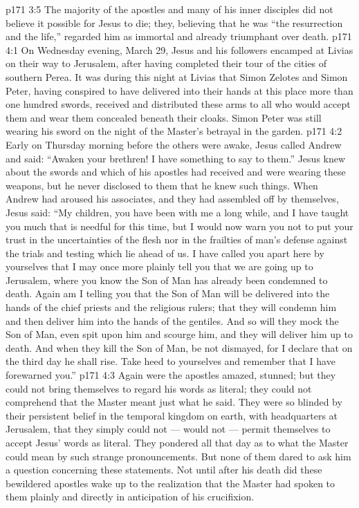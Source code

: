 \vs p171 3:5 The majority of the apostles and many of his inner disciples did not believe it possible for Jesus to die; they, believing that he was “the resurrection and the life,” regarded him as immortal and already triumphant over death.
\vs p171 4:1 On Wednesday evening, March 29, Jesus and his followers encamped at Livias on their way to Jerusalem, after having completed their tour of the cities of southern Perea. It was during this night at Livias that Simon Zelotes and Simon Peter, having conspired to have delivered into their hands at this place more than one hundred swords, received and distributed these arms to all who would accept them and wear them concealed beneath their cloaks. Simon Peter was still wearing his sword on the night of the Master’s betrayal in the garden.
\vs p171 4:2 Early on Thursday morning before the others were awake, Jesus called Andrew and said: \textcolor{ubdarkred}{“Awaken your brethren! I have something to say to them.”} Jesus knew about the swords and which of his apostles had received and were wearing these weapons, but he never disclosed to them that he knew such things. When Andrew had aroused his associates, and they had assembled off by themselves, Jesus said: \textcolor{ubdarkred}{“My children, you have been with me a long while, and I have taught you much that is needful for this time, but I would now warn you not to put your trust in the uncertainties of the flesh nor in the frailties of man’s defense against the trials and testing which lie ahead of us. I have called you apart here by yourselves that I may once more plainly tell you that we are going up to Jerusalem, where you know the Son of Man has already been condemned to death. Again am I telling you that the Son of Man will be delivered into the hands of the chief priests and the religious rulers; that they will condemn him and then deliver him into the hands of the gentiles. And so will they mock the Son of Man, even spit upon him and scourge him, and they will deliver him up to death. And when they kill the Son of Man, be not dismayed, for I declare that on the third day he shall rise. Take heed to yourselves and remember that I have forewarned you.”}
\vs p171 4:3 Again were the apostles amazed, stunned; but they could not bring themselves to regard his words as literal; they could not comprehend that the Master meant just what he said. They were so blinded by their persistent belief in the temporal kingdom on earth, with headquarters at Jerusalem, that they simply could not --- would not --- permit themselves to accept Jesus’ words as literal. They pondered all that day as to what the Master could mean by such strange pronouncements. But none of them dared to ask him a question concerning these statements. Not until after his death did these bewildered apostles wake up to the realization that the Master had spoken to them plainly and directly in anticipation of his crucifixion.
